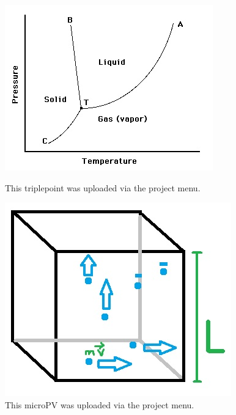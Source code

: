 \documentclass[a4paper]{article}
\begin{document}
\begin{figure}[h]
\centering
\begin{minipage}[b]{0.45\textwidth}
  \includegraphics[width=\textwidth]{figures/triplepoint.jpg}
  \caption{\label{fig:triplepoint}This triplepoint was uploaded via the project menu.}
\end{minipage}
\hfill
\begin{minipage}[b]{0.45\textwidth}
  \includegraphics[width=\textwidth]{figures/microPV.jpg}
  \caption{\label{fig:microPV}This microPV was uploaded via the project menu.}
\end{minipage}
\end{figure} \FloatBarrier
\end{document}
